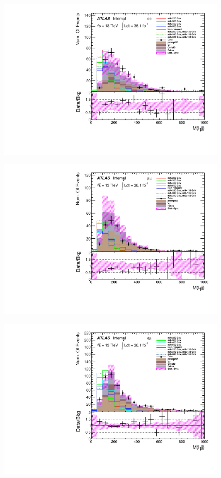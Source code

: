 \begin{figure}[h]
\begin{minipage}[t]{0.33\linewidth}
 \includegraphics[width=1.0\textwidth]{fig/dataMC_high_Njet_CR/m_l1jj_ee.pdf}\label{fig:dataMC_high_Njet_CR:m_l1jj_ee.pdf}
 \end{minipage}
  \begin{minipage}[t]{0.33\linewidth}
 \centering
 \includegraphics[width=1.0\textwidth]{fig/dataMC_high_Njet_CR/m_l1jj_mumu.pdf}\label{fig:dataMC_high_Njet_CR:m_l1jj_mumu.pdf}
 \end{minipage}
 \begin{minipage}[t]{0.33\linewidth}
 \centering
 \includegraphics[width=1.0\textwidth]{fig/dataMC_high_Njet_CR/m_l1jj_emu.pdf}\label{fig:dataMC_high_Njet_CR:m_l1jj_emu.pdf}

\end{minipage}
\end{figure}
